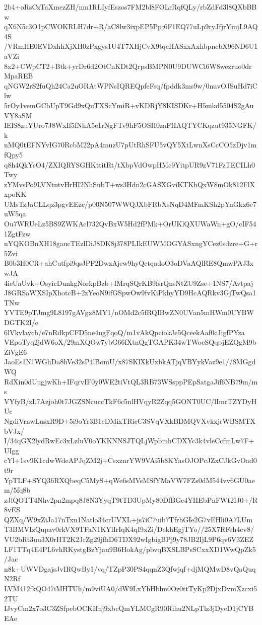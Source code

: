 2b4+oRsCzTaXmezZH/nm1RLIyfEszos7FM2bl8FOLrRqfQLy/rbZdFd3l8QXbBBw
qX6N5c3O1pCWOKRLH7dr+R/aC8lw3ixpEP5Ppj6F1EQ77uLp9ryJfjrYmjL9AQ4S
/VRmHE0EVDxhhXjXH0zPxgys1U4T7XHjCvX9tqcHASxxAxhbpncbX96ND6U1aVZi
8x2+CWpCT2+Btk+yrDr6d2OtCnKDt2QrpsBMPN0U9DUWCi6W8wezruo0drMpaREB
qNGW2rS2fuQh24Ca2uORAtWPNsIQREQpfeFsq/fpddk3ms9w/0nuvOJSuHd7iClw
5rOy1vemGCbUpT9Gd9xQuTXScYmiR+vKDRjY8KISDKr+H5mkd5504S2gAuVY8aSM
IElS8zuYUro7J8WxIf5fNhA5e1rNgFTv9hF5OSII0zaFHAQTYCKqzut935NGFK/k
nMQ0tEFNYvIG70RcbM22pA4muzU7pUtRhSFU5vQY5XtLwnXsCcCO5zDjv1mfQpy5
q8h4QkYcO4/ZXIQRYSGHKttitRt/tXbpVdOwpHMc9YitpUR9zV71FzTECILh0Twy
zYMvsPo9LVNtntvHrHI2NhSubT+ws3Hdn2cGASXGviKTKbQxW8mOk812FlXxpoKK
UMsTzJaCLLqz3pgvEEzc/p00N507WWQJXbFRbXsNqD4MFmKSh2pYnGkx6e7uW5qa
Ou7WRUeLz5BS9ZWKAcl732QvBxW5Hd2fPMk+OrUKlQXUWaWn+gO/cIF541ZgtFzw
nYQKOBnXH18gaucTEzlDiJ8DK8j378PLIkEUWMOGYASxngYCez0sdzre+G+r5Zvi
B0b3H0CR+ahCutfpi9qsJPF2DwzAjew9hyQctqadoO3oDVaAQlRE8QmwPAJ3xwJA
4ieUaUvk+OsyicDunkgNorkpBzb+IMrqSQrKB9fsrQnsNtZU9Zse+1NS7/Avtpaj
J8GRSaWXSIpXhotcB+2zYeoN9ifGSpwOw9fvKiPkhyYD9HcAQRkv3GjTwQsa1TNw
YVTE9pTJmg9L8197gAVgx8MY1/nOMd2c5fRQIBwZN0UVan5mHWm0UYBWDGTK2I/e
6lVkvlaycb/e7nRdkpCFD5ne4ugFqoQ/m1vAkQpciokJe5QceekAaf0cJigfPYza
VEpoTyq2jdW6oX/29mXQOw7ybG66fXtnQgTGAPK34wTWoeSQqpjEZQgM9bZiVgE6
JaoEs1N1WGhDa8hVe32sP4lBomU/x87SKlXkUxbkATjqVBYykVaz9e1//8MGgdWQ
RdXin0dUugjwKh+IFqrvIF0y0WE2tiVtQL3RB73WSsppPEpSatgaJif6NB79m/ms
VYfyB/zL7Azjoh0t7JGZSNcuccTkF6c5nlHVqyR2Zqq5GONT0UC/lImrTZYDyHUc
NgdiVrnwLusxR9D+5i9oYr3B1cDMixTRicC3SVqVXkBDMQVXvkxjrWBSMTXbVJx/
I/34qGX2lydRwEc3xLzluV0oYKKNNSJTQLjWpbmhCDXYc3k4vleCcfmLw7F+UIgg
cYl+1sv9K1cdwWdeAPJqZM2j+CsxznrYW9VAi5b8KYasOJOPcJZxCJkGvOad0t9r
YpTLF+SYQ36RXQbeqC5MyS+qWe6sMVsMSfYMaVW7FZs0dM544vv6GU0aem/5fq8b
zJlQOTT4Nhv2pn2mpq8J8N3YyqT9tTD3UpMy80DfBGc4YHEbPnFWt2IJ0+/R8vES
QZXq/W9xZiJa17nTxn1Natlo34crUVXL+js7iC7uib7TfrbGIe2G7vEHli0A7LUm
T3BMVIzQupav0rkVX9TFaN1KYlIrIqK4qI9xZi/DekhEgjTYo//25X7RFeh4cv8/
VU2bRt3uu3X0rHT2K2JrZg29jfhD6TDX92wIgbigBPj9y78JB2IjL9P6qv6V3ZEZ
LF1TTq4E4PL6vhRKystgBzYjau9B6HokAg/pbvqBXSLBPsSCxxXD1WwQpZk5/Jac
n8k+UWVDgajsJvIRQwBy1/vq/TZpP30PS4qqnZ3Qfwjqf+djMQMwD8vQaQuqN2Rf
LVM412fkQO47iMHTUh/m9viUA0/dW9LxYhHblm0Oz0ttTyKp2DjxDvmXzcxi52TU
IJvyCm2x7o3C3ZSfpebOCKHnj9xbcQmYLMCgR90Rihu2NLpTlz3jDycD1jCYBEAe
